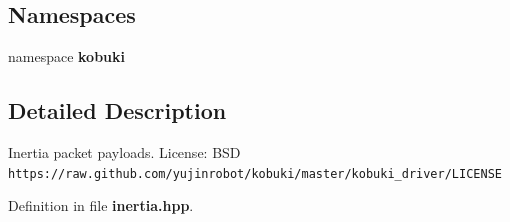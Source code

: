 \subsection*{\-Namespaces}
\begin{DoxyCompactItemize}
\item 
namespace {\bf kobuki}
\end{DoxyCompactItemize}


\subsection{\-Detailed \-Description}
\-Inertia packet payloads. \-License\-: \-B\-S\-D {\tt https\-://raw.\-github.\-com/yujinrobot/kobuki/master/kobuki\-\_\-driver/\-L\-I\-C\-E\-N\-S\-E} 

\-Definition in file {\bf inertia.\-hpp}.


